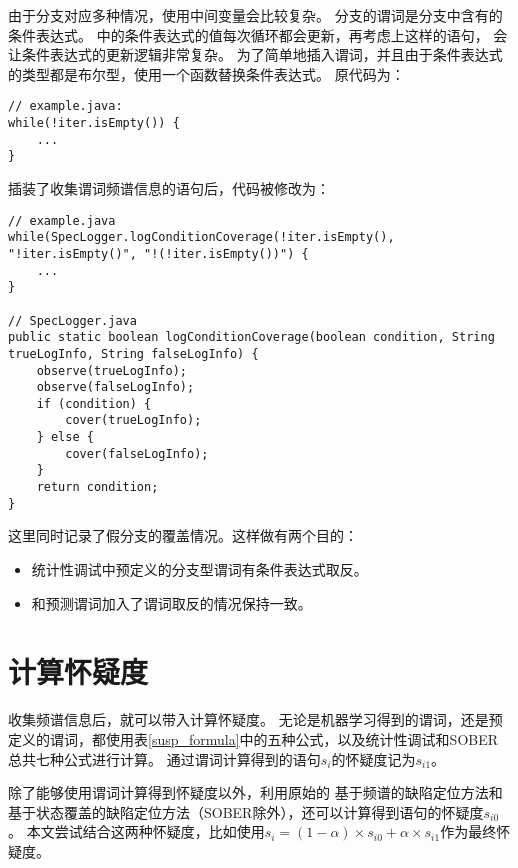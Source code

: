 由于分支对应多种情况，使用中间变量会比较复杂。
分支的谓词是分支中含有的条件表达式。
中的条件表达式的值每次循环都会更新，再考虑上这样的语句，
会让条件表达式的更新逻辑非常复杂。
为了简单地插入谓词，并且由于条件表达式的类型都是布尔型，使用一个函数替换条件表达式。
原代码为：
\lstset{language=Java}
\begin{lstlisting}
// example.java:
while(!iter.isEmpty()) {
	...
}
\end{lstlisting}
插装了收集谓词频谱信息的语句后，代码被修改为：
\lstset{language=Java}
\begin{lstlisting}
// example.java
while(SpecLogger.logConditionCoverage(!iter.isEmpty(), "!iter.isEmpty()", "!(!iter.isEmpty())") {
	...
}

// SpecLogger.java
public static boolean logConditionCoverage(boolean condition, String trueLogInfo, String falseLogInfo) {
	observe(trueLogInfo);
	observe(falseLogInfo);
	if (condition) {
		cover(trueLogInfo);
	} else {
		cover(falseLogInfo);
	}
	return condition;
}
\end{lstlisting}
这里同时记录了假分支的覆盖情况。这样做有两个目的：
\begin{itemize}
\item 统计性调试中预定义的分支型谓词有条件表达式取反。
\item 和预测谓词加入了谓词取反的情况保持一致。
\end{itemize}

\section{计算怀疑度}

收集频谱信息后，就可以带入计算怀疑度。
无论是机器学习得到的谓词，还是预定义的谓词，都使用表\ref{susp_formula}中的五种公式，以及统计性调试和SOBER总共七种公式进行计算。
通过谓词计算得到的语句$s_i$的怀疑度记为$s_{i1}$。

除了能够使用谓词计算得到怀疑度以外，利用原始的
基于频谱的缺陷定位方法和基于状态覆盖的缺陷定位方法（SOBER除外），还可以计算得到语句的怀疑度$s_{i0}$。
本文尝试结合这两种怀疑度，比如使用$s_i = (1 - \alpha) \times s_{i0} + \alpha \times s_{i1}$作为最终怀疑度。

